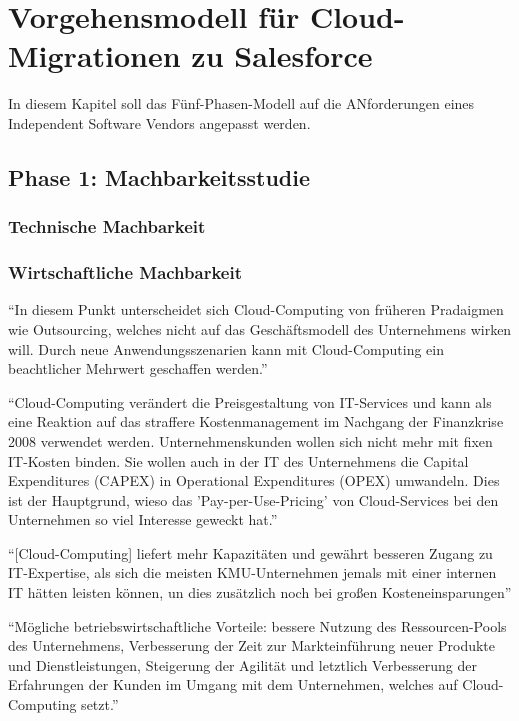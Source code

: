 \section{Vorgehensmodell für Cloud-Migrationen zu Salesforce}
\label{cha:entwickelung_vorgehensmodell}
In diesem Kapitel soll das Fünf-Phasen-Modell auf die ANforderungen eines 
Independent Software Vendors angepasst werden.

\subsection{Phase 1: Machbarkeitsstudie}
\subsubsection{Technische Machbarkeit}


\subsubsection{Wirtschaftliche Machbarkeit}
"`In diesem Punkt unterscheidet sich Cloud-Computing von früheren Pradaigmen 
wie Outsourcing, welches nicht auf das Geschäftsmodell des Unternehmens wirken 
will. Durch neue Anwendungsszenarien kann mit Cloud-Computing ein beachtlicher 
Mehrwert geschaffen werden."' 

"`Cloud-Computing verändert die Preisgestaltung von IT-Services und kann als 
eine Reaktion  auf das straffere Kostenmanagement im Nachgang der Finanzkrise 
2008 verwendet werden. Unternehmenskunden wollen sich nicht mehr mit fixen 
IT-Kosten binden. Sie wollen auch in der IT des Unternehmens die Capital 
Expenditures (CAPEX) in Operational Expenditures (OPEX) umwandeln. Dies ist der 
Hauptgrund, wieso das 'Pay-per-Use-Pricing' von Cloud-Services bei den 
 Unternehmen so viel Interesse geweckt hat."' 

"`[Cloud-Computing] liefert mehr Kapazitäten und gewährt besseren Zugang zu 
IT-Expertise, als sich die meisten KMU-Unternehmen jemals mit einer internen IT 
hätten leisten können, un  dies zusätzlich noch bei großen Kosteneinsparungen"' 

"`Mögliche betriebswirtschaftliche Vorteile: bessere Nutzung des 
Ressourcen-Pools des Unternehmens, Verbesserung der Zeit zur Markteinführung 
neuer Produkte und Dienstleistungen, Steigerung der Agilität und letztlich 
Verbesserung der Erfahrungen der Kunden im Umgang mit dem Unternehmen, 
welches auf Cloud-Computing setzt."' 


